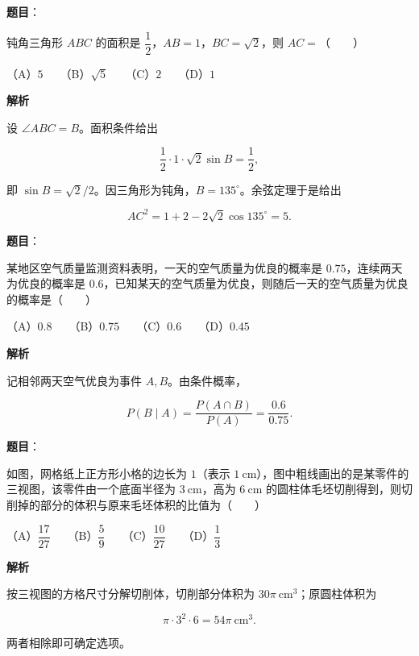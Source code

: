 \begin{answer}

\textbf{题目}：

钝角三角形 $ABC$ 的面积是 $\dfrac12$，$AB=1$，$BC=\sqrt2$，则 $AC=$\mbox{（　　）}

（A）$5$　　（B）$\sqrt5$　　（C）$2$　　（D）$1$

\textbf{解析}

设 $\angle ABC=B$。面积条件给出

\nopagebreak[4]
\[
\frac12\cdot1\cdot\sqrt2\sin B=\frac12,
\]

即 $\sin B=\sqrt2/2$。因三角形为钝角，$B=135^\circ$。余弦定理于是给出

\nopagebreak[4]
\[
AC^2=1+2-2\sqrt2\cos135^\circ=5.
\]


\end{answer}
\begin{answer}

\textbf{题目}：

某地区空气质量监测资料表明，一天的空气质量为优良的概率是 $0.75$，连续两天为优良的概率是 $0.6$，已知某天的空气质量为优良，则随后一天的空气质量为优良的概率是\mbox{（　　）}

（A）$0.8$　　（B）$0.75$　　（C）$0.6$　　（D）$0.45$

\textbf{解析}

记相邻两天空气优良为事件 $A,B$。由条件概率，

\nopagebreak[4]
\[
P(B\mid A)=\frac{P(A\cap B)}{P(A)}=\frac{0.6}{0.75}.
\]


\end{answer}
\begin{answer}

\textbf{题目}：

如图，网格纸上正方形小格的边长为 $1$（表示 $1\ \mathrm{cm}$），图中粗线画出的是某零件的三视图，该零件由一个底面半径为 $3\ \mathrm{cm}$，高为 $6\ \mathrm{cm}$ 的圆柱体毛坯切削得到，则切削掉的部分的体积与原来毛坯体积的比值为\mbox{（　　）}
\nopagebreak[4]
\begin{center}\end{center}
\nopagebreak[4]
（A）$\dfrac{17}{27}$　　（B）$\dfrac59$　　（C）$\dfrac{10}{27}$　　（D）$\dfrac13$

\textbf{解析}

按三视图的方格尺寸分解切削体，切削部分体积为 $30\pi\ \mathrm{cm}^3$；原圆柱体积为

\nopagebreak[4]
\[
\pi\cdot3^2\cdot6=54\pi\ \mathrm{cm}^3.
\]

两者相除即可确定选项。


\end{answer}
